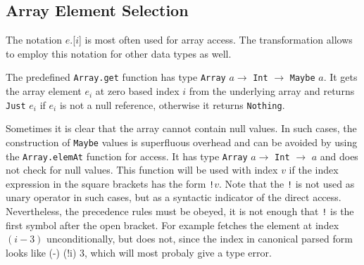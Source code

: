
\subsection{Array Element Selection} \label{arrayop}

The notation $e$.[$i$] is most often used for array access. The transformation allows to employ this notation for other data types as well.


The predefined \texttt{Array.get} function has type \texttt{Array} $a \rightarrow$ \texttt{Int} $\rightarrow$ \texttt{Maybe} $a$. It gets the array element $e_i$ at zero based index $i$ from the underlying \java{} array and returns \texttt{Just} $e_i$ if $e_i$ is not a null reference, otherwise it returns \texttt{Nothing}.

Sometimes it is clear that the array cannot contain null values. In such cases, the construction of \texttt{Maybe} values is superfluous overhead and can be avoided by using the \texttt{Array.elemAt} function for access. It has type \texttt{Array} $a \rightarrow$ \texttt{Int} $\rightarrow$ $a$ and does not check for null values. This function will be used with index $v$ if the index expression in the square brackets has the form \texttt{!}$v$. Note that the \texttt{!} is not used as unary operator in such cases, but as a syntactic indicator of the direct access. Nevertheless, the precedence rules must be obeyed, it is not enough that \texttt{!} is the first symbol after the open bracket. For example 
fetches the element at index $(i-3)$ unconditionally, but 
does not, since the index in canonical parsed form looks like (-) (!i) 3, which will most probaly give a type error.

